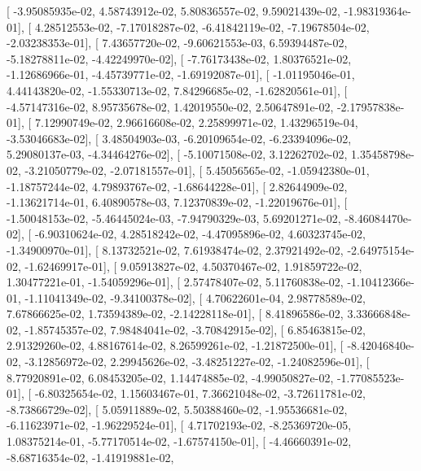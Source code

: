\documentclass{article}
\begin{document}
       [ -3.95085935e-02,   4.58743912e-02,   5.80836557e-02,
          9.59021439e-02,  -1.98319364e-01],
       [  4.28512553e-02,  -7.17018287e-02,  -6.41842119e-02,
         -7.19678504e-02,  -2.03238353e-01],
       [  7.43657720e-02,  -9.60621553e-03,   6.59394487e-02,
         -5.18278811e-02,  -4.42249970e-02],
       [ -7.76173438e-02,   1.80376521e-02,  -1.12686966e-01,
         -4.45739771e-02,  -1.69192087e-01],
       [ -1.01195046e-01,   4.44143820e-02,  -1.55330713e-02,
          7.84296685e-02,  -1.62820561e-01],
       [ -4.57147316e-02,   8.95735678e-02,   1.42019550e-02,
          2.50647891e-02,  -2.17957838e-01],
       [  7.12990749e-02,   2.96616608e-02,   2.25899971e-02,
          1.43296519e-04,  -3.53046683e-02],
       [  3.48504903e-03,  -6.20109654e-02,  -6.23394096e-02,
          5.29080137e-03,  -4.34464276e-02],
       [ -5.10071508e-02,   3.12262702e-02,   1.35458798e-02,
         -3.21050779e-02,  -2.07181557e-01],
       [  5.45056565e-02,  -1.05942380e-01,  -1.18757244e-02,
          4.79893767e-02,  -1.68644228e-01],
       [  2.82644909e-02,  -1.13621714e-01,   6.40890578e-03,
          7.12370839e-02,  -1.22019676e-01],
       [ -1.50048153e-02,  -5.46445024e-03,  -7.94790329e-03,
          5.69201271e-02,  -8.46084470e-02],
       [ -6.90310624e-02,   4.28518242e-02,  -4.47095896e-02,
          4.60323745e-02,  -1.34900970e-01],
       [  8.13732521e-02,   7.61938474e-02,   2.37921492e-02,
         -2.64975154e-02,  -1.62469917e-01],
       [  9.05913827e-02,   4.50370467e-02,   1.91859722e-02,
          1.30477221e-01,  -1.54059296e-01],
       [  2.57478407e-02,   5.11760838e-02,  -1.10412366e-01,
         -1.11041349e-02,  -9.34100378e-02],
       [  4.70622601e-04,   2.98778589e-02,   7.67866625e-02,
          1.73594389e-02,  -2.14228118e-01],
       [  8.41896586e-02,   3.33666848e-02,  -1.85745357e-02,
          7.98484041e-02,  -3.70842915e-02],
       [  6.85463815e-02,   2.91329260e-02,   4.88167614e-02,
          8.26599261e-02,  -1.21872500e-01],
       [ -8.42046840e-02,  -3.12856972e-02,   2.29945626e-02,
         -3.48251227e-02,  -1.24082596e-01],
       [  8.77920891e-02,   6.08453205e-02,   1.14474885e-02,
         -4.99050827e-02,  -1.77085523e-01],
       [ -6.80325654e-02,   1.15603467e-01,   7.36621048e-02,
         -3.72611781e-02,  -8.73866729e-02],
       [  5.05911889e-02,   5.50388460e-02,  -1.95536681e-02,
         -6.11623971e-02,  -1.96229524e-01],
       [  4.71702193e-02,  -8.25369720e-05,   1.08375214e-01,
         -5.77170514e-02,  -1.67574150e-01],
       [ -4.46660391e-02,  -8.68716354e-02,  -1.41919881e-02,
\end{document}

